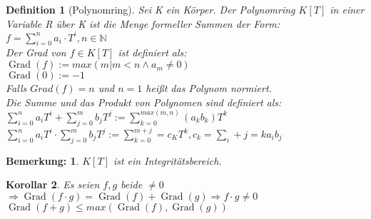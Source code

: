 \documentclass{report}
\newcommand{\N}{\mathbb{N}}
\DeclareMathOperator{\Grad}{Grad}
\theoremstyle{customrem}
\newtheorem*{bemerkung}{Bemerkung\textnormal:}
\theoremstyle{customdef}
\newtheorem{definition}{Definition}[chapter]
\newtheorem{korrolar}[definition]{Korollar}
\theoremstyle{customenv}
\begin{document}
\begin{definition}[Polynomring]
  Sei K ein K\"orper. Der Polynomring \(K[T]\) in einer Variable R \"uber K ist
  die Menge formeller Summen der Form:\\
  \(f = \sum_{i = 0}^n a_i \cdot T^i, n \in \N\)\\
  Der Grad von \(f \in K[T]\) ist definiert als:\\
  \(\Grad(f) := max(m | m < n \land a_m \neq 0)\)\\
  \(\Grad(0) := -1\)\\
  Falls \(Grad(f) = n\) und \(n = 1\) hei\ss{}t das Polynom normiert.\\
  Die Summe und das Produkt von Polynomen sind definiert als:\\
  \(
    \sum_{i=0}^n a_i T^i + \sum_{j=0}^m b_j T^j 
    := \sum_{k=0}^{max(m,n)} (a_k b_k) T^k
  \)\\
  \(
    \sum_{i=0}^n a_i T^i \cdot \sum_{j=0}^m b_j T^j 
    := \sum_{k=0}^{m+j} = c_K T^k, c_k = \sum_i+j=k a_i b_j
  \)\\
\end{definition}

\begin{bemerkung}
  \(K[T]\) ist ein Integrit\"atsbereich.\\
\end{bemerkung}

\begin{korrolar}
  Es seien \(f, g\) beide \(\neq 0\)\\
  \(
    \Rightarrow \Grad(f \cdot g)
    = \Grad(f) + \Grad(g) \Rightarrow f \cdot g \neq 0
  \)\\
  \(\Grad(f+g) \le max(\Grad(f), \Grad(g))\)\\
\end{korrolar}
\end{document}
